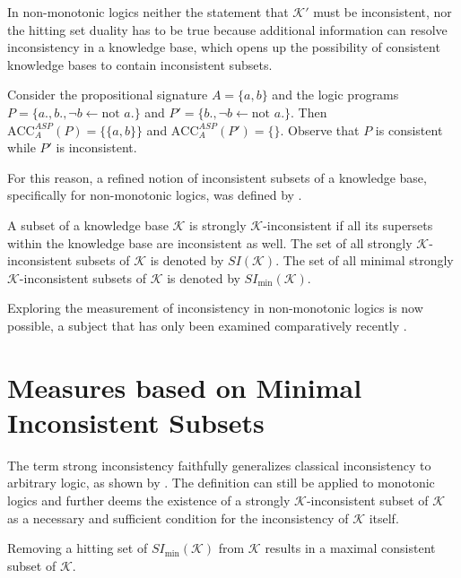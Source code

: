 In non-monotonic logics neither the statement that \(\mathcal{K}'\) must be inconsistent, nor the hitting set duality has to be true because additional information can resolve inconsistency in a knowledge base, which opens up the possibility of consistent knowledge bases to contain inconsistent subsets.

\begin{example}
    Consider the propositional signature \(A = \{a, b\}\) and the logic programs \(P = \{a., b., \neg b \leftarrow \text{not }a.\}\) and \(P' = \{b., \neg b \leftarrow \text{not }a.\}\). Then \(\text{ACC}_A^{ASP}(P) = \{\{a,b\}\}\) and \(\text{ACC}_A^{ASP}(P') = \{\}\). Observe that \(P\) is consistent while \(P'\) is inconsistent.
\end{example}

For this reason, a refined notion of inconsistent subsets of a knowledge base, specifically for non-monotonic logics, was defined by \cite{brewka_strong_2017}.
\begin{definition}
    A subset of a knowledge base \(\mathcal{K}\) is strongly \(\mathcal{K}\)-inconsistent if all its supersets within the knowledge base are inconsistent as well. The set of all strongly \(\mathcal{K}\)-inconsistent subsets of \(\mathcal{K}\) is denoted by \(SI(\mathcal{K})\). The set of all minimal strongly \(\mathcal{K}\)-inconsistent subsets of \(\mathcal{K}\) is denoted by \(SI_{\min}(\mathcal{K})\).
\end{definition}

Exploring the measurement of inconsistency in non-monotonic logics is now possible, a subject that has only been examined comparatively recently \cite{ulbricht_measuring_2018} \cite{brewka_strong_2019} \cite{ulbricht_handling_2020}.

\section{Measures based on Minimal Inconsistent Subsets}
The term strong inconsistency faithfully generalizes classical inconsistency to arbitrary logic, as shown by \cite{brewka_strong_2017}. The definition can still be applied to monotonic logics and further deems the existence of a strongly \(\mathcal{K}\)-inconsistent subset of \(\mathcal{K}\) as a necessary and sufficient condition for the inconsistency of \(\mathcal{K}\) itself.

\begin{theorem}
    Removing a hitting set of \(SI_{\min}(\mathcal{K})\) from \(\mathcal{K}\) results in a maximal consistent subset of \(\mathcal{K}\).
\end{theorem}

